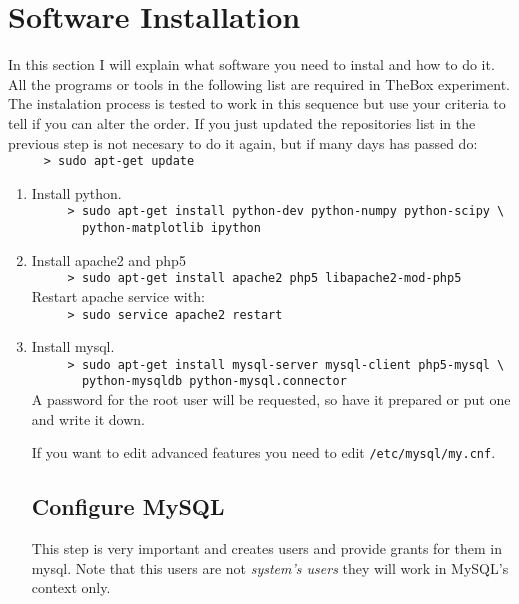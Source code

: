  \section{Software Installation}
  In this section I will explain what software you need to instal and how to do it. All the programs or tools in the following list
  are required in TheBox experiment. The instalation process is tested to work in this sequence but use your criteria to tell if 
  you can alter the order. If you just updated the repositories list in the previous step is not necesary to do it again, but if many days has passed do:\\
     \verb=     > sudo apt-get update=\\
  \begin{enumerate}
   \item Install python.\\
     \verb=     > sudo apt-get install python-dev python-numpy python-scipy \=\\
     \verb=       python-matplotlib ipython=\\
  \item Install apache2 and php5  \\
     \verb=     > sudo apt-get install apache2 php5 libapache2-mod-php5=\\
  Restart apache service with:\\
     \verb=     > sudo service apache2 restart=\\
  \item Install mysql.\\
     \verb=     > sudo apt-get install mysql-server mysql-client php5-mysql \=\\
     \verb=       python-mysqldb python-mysql.connector=\\
  A password for the root user will be requested, so have it prepared or put one and write it down.
  
  If you want to edit advanced features you need to edit \verb=/etc/mysql/my.cnf=.
  
  \subsection{Configure MySQL}
  This step is very important and creates users and provide grants for them in mysql. Note that this users are not \emph{system's users} they 
  will work in MySQL's context only.
  

\end{enumerate}
